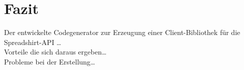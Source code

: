 \section{Fazit}
\label{sec:conclusion}

Der entwickelte Codegenerator zur Erzeugung einer Client-Bibliothek für die Spreadshirt-\gls{API} \ldots\\
Vorteile die sich daraus ergeben\ldots\\
Probleme bei der Erstellung\ldots

